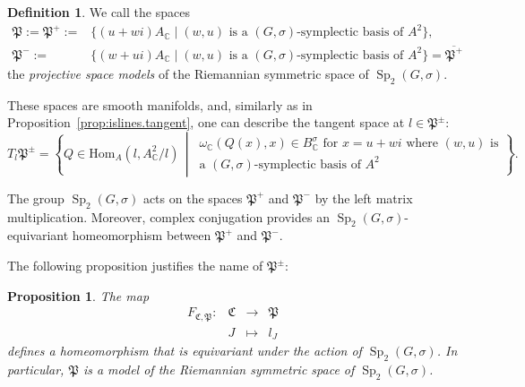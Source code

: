 \documentclass[a4paper,oneside,11pt]{amsart}
\DeclareMathOperator{\Sp}{Sp}
\newcommand{\midwd}{\,\middle\vert\,}
\newcommand{\CC}{\mathbb C}
\theoremstyle{plain}
\newtheorem{prop}[teo]{Proposition}
\theoremstyle{definition}
\newtheorem{df}[teo]{Definition}
\theoremstyle{remark}
\newcommand{\defin}{\emph}
\begin{document}
\begin{df}
We call the spaces 
\begin{align*}
    \mathfrak P:=\mathfrak P^+:=&\{(u+wi)A_\CC\mid (w,u)\text{ is a $(G,\sigma)$-symplectic basis of $A^2$}\},\\
    \mathfrak P^-:=&\{(w+ui)A_\CC\mid (w,u)\text{ is a $(G,\sigma)$-symplectic basis of $A^2$}\}=\overline{\mathfrak P^+}
\end{align*}
the \defin{projective space models} of the Riemannian symmetric space of $\Sp_2(G,\sigma)$.
\end{df}
 
\noindent These spaces are smooth manifolds, and, similarly as in Proposition~\ref{prop:islines.tangent}, one can describe the tangent space at $l\in \mathfrak P^\pm$:
\begin{equation*}
    T_l\mathfrak P^\pm=\left\{Q\in\mathrm{Hom}_A(l,A_\mathbb C^2/l)\midwd\begin{array}{l} \omega_\mathbb C(Q(x),x)\in B^{\sigma}_\mathbb C\text{ for $x=u+wi$ where $(w,u)$ is} \\
    \text{a $(G,\sigma)$-symplectic basis of $A^2$}
    \end{array}\right\}.
\end{equation*}
 


The group $\Sp_2(G,\sigma)$ acts on the spaces $\mathfrak P^+$ and $\mathfrak P^-$ by the left matrix multiplication. Moreover, complex conjugation provides an $\Sp_2(G,\sigma)$-equivariant homeomorphism between $\mathfrak P^+$ and $\mathfrak P^-$.

The following proposition justifies the name of $\mathfrak P^\pm$:

\begin{prop}
The map
$$\begin{array}{cccl}
F_{\mathfrak C,\mathfrak P}\colon& \mathfrak C& \to & \mathfrak P\\
 & J & \mapsto & l_J
\end{array}$$
defines a homeomorphism that is equivariant under the action of $\Sp_2(G,\sigma)$. In particular, $\mathfrak P$ is a model of the Riemannian symmetric space of $\Sp_2(G,\sigma)$.
\end{prop}
\end{document}
